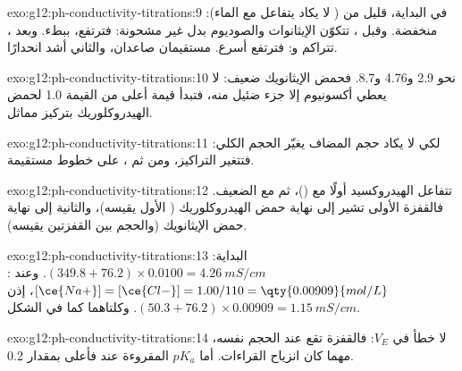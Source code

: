 \begin{solution}{exo:g12:ph-conductivity-titrations:9}
في البداية، قليل من  ( لا يكاد يتفاعل مع الماء): 
منخفضة. وقبل ، تتكوّن  الإيثانوات والصوديوم
بدل  غير مشحونة: فترتفع، ببطء. وبعد ، تتراكم
 و: فترتفع أسرع. مستقيمان صاعدان،
والثاني أشد انحدارًا.
\end{solution}

\begin{solution}{exo:g12:ph-conductivity-titrations:10}
نحو 2.9 و4.76 و8.7. فحمض الإيثانويك ضعيف: لا يعطي  أكسونيوم
إلا جزء ضئيل منه، فتبدأ قيمة  أعلى من القيمة 1.0 لحمض الهيدروكلوريك
بتركيز مماثل.
\end{solution}

\begin{solution}{exo:g12:ph-conductivity-titrations:11}
لكي لا يكاد حجم  المضاف يغيّر الحجم الكلي: فتتغير
التراكيز، ومن ثم ، على خطوط مستقيمة.
\end{solution}

\begin{solution}{exo:g12:ph-conductivity-titrations:12}
تتفاعل  الهيدروكسيد أولًا مع  ()، ثم
مع الضعيف. فالقفزة الأولى تشير إلى نهاية حمض الهيدروكلوريك
( الأول يقيسه)، والثانية إلى نهاية حمض الإيثانويك
(والحجم بين القفزتين يقيسه).
\end{solution}

\begin{solution}{exo:g12:ph-conductivity-titrations:13}
البداية: $(349.8 + 76.2) \times 0.0100 = \qty{4.26}{mS/cm}$. وعند
: $[\ce{Na+}] = [\ce{Cl-}] = 1.00/110 = \qty{0.00909}{mol/L}$،
إذن $(50.3 + 76.2) \times 0.00909 = \qty{1.15}{mS/cm}$. وكلتاهما كما في
الشكل.
\end{solution}

\begin{solution}{exo:g12:ph-conductivity-titrations:14}
لا خطأ في $V_E$: فالقفزة تقع عند الحجم نفسه، مهما كان انزياح
القراءات. أما $pK_a$ المقروءة عند  فأعلى بمقدار 0.2.
\end{solution}

